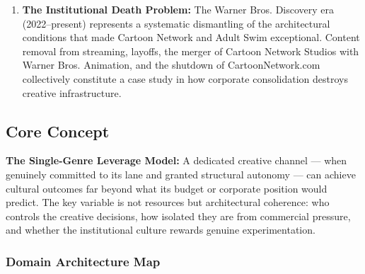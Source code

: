 \documentclass[11pt,letterpaper]{article}
\begin{document}
\begin{enumerate}
  \item \textbf{The Institutional Death Problem:} The Warner Bros. Discovery era (2022--present) represents a systematic dismantling of the architectural conditions that made Cartoon Network and Adult Swim exceptional. Content removal from streaming, layoffs, the merger of Cartoon Network Studios with Warner Bros. Animation, and the shutdown of CartoonNetwork.com collectively constitute a case study in how corporate consolidation destroys creative infrastructure.
\end{enumerate}

\subsection{Core Concept}

\begin{quotebox}
\textbf{The Single-Genre Leverage Model:} A dedicated creative channel --- when genuinely committed to its lane and granted structural autonomy --- can achieve cultural outcomes far beyond what its budget or corporate position would predict. The key variable is not resources but architectural coherence: who controls the creative decisions, how isolated they are from commercial pressure, and whether the institutional culture rewards genuine experimentation.
\end{quotebox}

\subsubsection{Domain Architecture Map}
\end{document}
